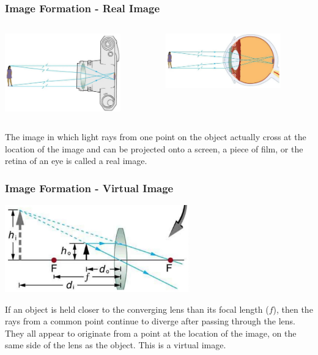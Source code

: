 \documentclass{beamer}
\begin{document}
\begin{frame}\frametitle{Image Formation - Real Image}
\begin{columns}
\begin{column}{5.5cm}
\begin{center}
\includegraphics[width=5cm]{fig/imageform2.jpg}
\end{center}
\end{column}
\begin{column}{5.5cm}
\begin{center}
\includegraphics[width=5cm]{fig/imageform3.jpg}
\end{center}
\end{column}
\end{columns}

\vspace{1cm}

The image in which light rays from one point on the object actually cross at the location of the image and can be projected onto a screen, a piece of film, or the retina of an eye is called a real image.

\end{frame}

\begin{frame}\frametitle{Image Formation - Virtual Image}

\begin{center}
\includegraphics[width=8cm]{fig/imageform4.jpg}
\end{center}

If an object is held closer to the converging lens than its focal length ($f$), then the rays from a common point continue to diverge after passing through the lens. They all appear to originate from a point at the location of the image, on the same side of the lens as the object. This is a virtual image. 


\end{frame}
\end{document}
